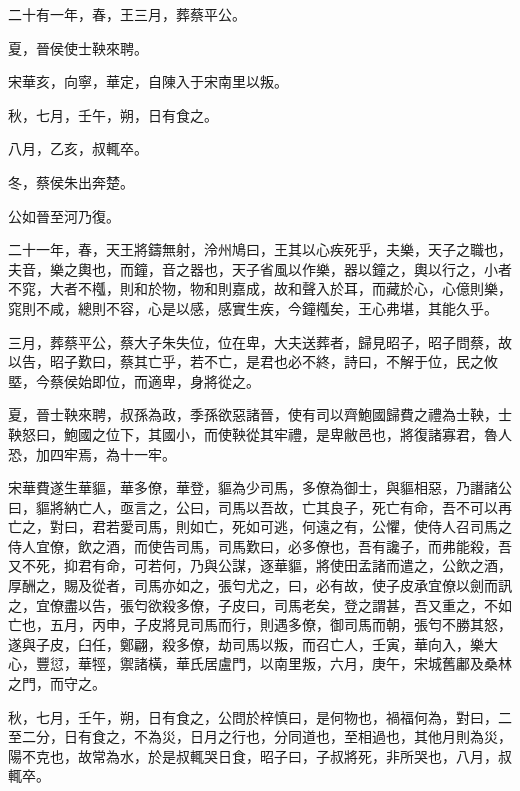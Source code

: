 \begin{pinyinscope}
二十有一年，春，王三月，葬蔡平公。

夏，晉侯使士鞅來聘。

宋華亥，向寧，華定，自陳入于宋南里以叛。

秋，七月，壬午，朔，日有食之。

八月，乙亥，叔輒卒。

冬，蔡侯朱出奔楚。

公如晉至河乃復。

二十一年，春，天王將鑄無射，泠州鳩曰，王其以心疾死乎，夫樂，天子之職也，夫音，樂之輿也，而鐘，音之器也，天子省風以作樂，器以鐘之，輿以行之，小者不窕，大者不槬，則和於物，物和則嘉成，故和聲入於耳，而藏於心，心億則樂，窕則不咸，總則不容，心是以感，感實生疾，今鐘槬矣，王心弗堪，其能久乎。

三月，葬蔡平公，蔡大子朱失位，位在卑，大夫送葬者，歸見昭子，昭子問蔡，故以告，昭子歎曰，蔡其亡乎，若不亡，是君也必不終，詩曰，不解于位，民之攸塈，今蔡侯始即位，而適卑，身將從之。

夏，晉士鞅來聘，叔孫為政，季孫欲惡諸晉，使有司以齊鮑國歸費之禮為士鞅，士鞅怒曰，鮑國之位下，其國小，而使鞅從其牢禮，是卑敝邑也，將復諸寡君，魯人恐，加四牢焉，為十一牢。

宋華費遂生華貙，華多僚，華登，貙為少司馬，多僚為御士，與貙相惡，乃譖諸公曰，貙將納亡人，亟言之，公曰，司馬以吾故，亡其良子，死亡有命，吾不可以再亡之，對曰，君若愛司馬，則如亡，死如可逃，何遠之有，公懼，使侍人召司馬之侍人宜僚，飲之酒，而使告司馬，司馬歎曰，必多僚也，吾有讒子，而弗能殺，吾又不死，抑君有命，可若何，乃與公謀，逐華貙，將使田孟諸而遣之，公飲之酒，厚酬之，賜及從者，司馬亦如之，張匄尤之，曰，必有故，使子皮承宜僚以劍而訊之，宜僚盡以告，張匄欲殺多僚，子皮曰，司馬老矣，登之謂甚，吾又重之，不如亡也，五月，丙申，子皮將見司馬而行，則遇多僚，御司馬而朝，張匄不勝其怒，遂與子皮，臼任，鄭翩，殺多僚，劫司馬以叛，而召亡人，壬寅，華向入，樂大心，豐愆，華牼，禦諸橫，華氏居盧門，以南里叛，六月，庚午，宋城舊鄘及桑林之門，而守之。

秋，七月，壬午，朔，日有食之，公問於梓慎曰，是何物也，禍福何為，對曰，二至二分，日有食之，不為災，日月之行也，分同道也，至相過也，其他月則為災，陽不克也，故常為水，於是叔輒哭日食，昭子曰，子叔將死，非所哭也，八月，叔輒卒。


\end{pinyinscope}
